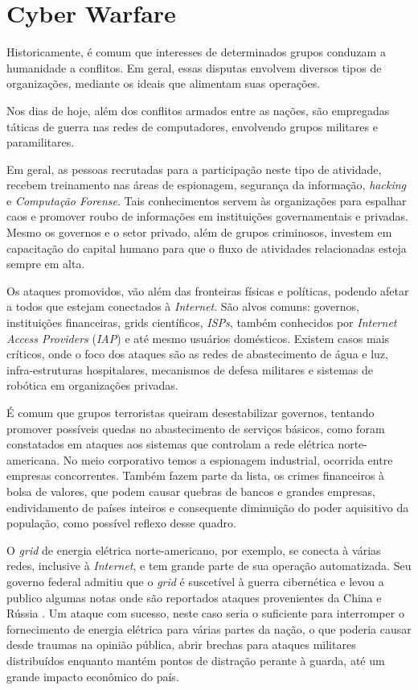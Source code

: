 \section{Cyber Warfare}

Historicamente, é comum que interesses de determinados grupos conduzam a humanidade a conflitos. Em geral, essas disputas envolvem diversos tipos de organizações, mediante os ideais que alimentam suas operações.

Nos dias de hoje, além dos conflitos armados entre as nações, são empregadas táticas de guerra nas redes de computadores, envolvendo grupos militares e paramilitares.

Em geral, as pessoas recrutadas para a participação neste tipo de atividade, recebem treinamento nas áreas de espionagem, segurança da informação, \textit{hacking} e \textit{Computação Forense}. Tais conhecimentos servem às organizações para espalhar caos e promover roubo de informações em instituições governamentais e privadas. Mesmo os governos e o setor privado, além de grupos criminosos, investem\cite{USCyberAttack} em capacitação do capital humano para que o fluxo de atividades relacionadas esteja sempre em alta.

Os ataques promovidos, vão além das fronteiras físicas e políticas, podendo afetar a todos que estejam conectados à \textit{Internet}. São alvos comuns: governos, instituições financeiras, grids científicos, \textit{ISPs}, também conhecidos por \textit{Internet Access Providers} (\textit{IAP}) e até mesmo usuários domésticos. Existem casos mais críticos, onde o foco dos ataques são as redes de abastecimento de água e luz, infra-estruturas hospitalares, mecanismos de defesa militares e sistemas de robótica em organizações privadas.

É comum que grupos terroristas queiram desestabilizar governos, tentando promover possíveis quedas no abastecimento de serviços básicos, como foram constatados em ataques aos sistemas que controlam a rede elétrica norte-americana. No meio corporativo temos a espionagem industrial, ocorrida entre empresas concorrentes. Também fazem parte da lista, os crimes financeiros à bolsa de valores, que podem causar quebras de bancos e grandes empresas, endividamento de países inteiros e consequente diminuição do poder aquisitivo da população, como possível reflexo desse quadro.

O \textit{grid} de energia elétrica norte-americano, por exemplo, se conecta à várias redes, inclusive à \textit{Internet}, e tem grande parte de sua operação automatizada. Seu governo federal admitiu que o \textit{grid} é suscetível à guerra cibernética e levou a publico algumas notas onde são reportados ataques provenientes da China e Rússia\cite{ChinaWarfare} \cite{PragmaticJourneyWarefare} \cite{ChinhaRussianWarefare}. Um ataque com sucesso, neste caso seria o suficiente para interromper o fornecimento de energia elétrica para várias partes da nação, o que poderia causar desde traumas na opinião pública, abrir brechas para ataques militares distribuídos enquanto mantém pontos de distração perante à guarda, até um grande impacto econômico do país.

